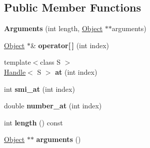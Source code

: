 \subsection*{Public Member Functions}
\begin{DoxyCompactItemize}
\item 
\hypertarget{classv8_1_1internal_1_1_b_a_s_e___e_m_b_e_d_d_e_d_add33908956d9bed09a8bca6b0d740f15}{}{\bfseries Arguments} (int length, \hyperlink{classv8_1_1internal_1_1_object}{Object} $\ast$$\ast$arguments)\label{classv8_1_1internal_1_1_b_a_s_e___e_m_b_e_d_d_e_d_add33908956d9bed09a8bca6b0d740f15}

\item 
\hypertarget{classv8_1_1internal_1_1_b_a_s_e___e_m_b_e_d_d_e_d_abc66cea105fe88e86c3d7b8dde50a580}{}\hyperlink{classv8_1_1internal_1_1_object}{Object} $\ast$\& {\bfseries operator\mbox{[}$\,$\mbox{]}} (int index)\label{classv8_1_1internal_1_1_b_a_s_e___e_m_b_e_d_d_e_d_abc66cea105fe88e86c3d7b8dde50a580}

\item 
\hypertarget{classv8_1_1internal_1_1_b_a_s_e___e_m_b_e_d_d_e_d_a798750e6054524ded89f7e3aae595cc9}{}{\footnotesize template$<$class S $>$ }\\\hyperlink{classv8_1_1internal_1_1_handle}{Handle}$<$ S $>$ {\bfseries at} (int index)\label{classv8_1_1internal_1_1_b_a_s_e___e_m_b_e_d_d_e_d_a798750e6054524ded89f7e3aae595cc9}

\item 
\hypertarget{classv8_1_1internal_1_1_b_a_s_e___e_m_b_e_d_d_e_d_a0baf7dbae1e7fffaaf243aafc160ef2c}{}int {\bfseries smi\+\_\+at} (int index)\label{classv8_1_1internal_1_1_b_a_s_e___e_m_b_e_d_d_e_d_a0baf7dbae1e7fffaaf243aafc160ef2c}

\item 
\hypertarget{classv8_1_1internal_1_1_b_a_s_e___e_m_b_e_d_d_e_d_a96a0211888c152b4db1c32fd169fab7b}{}double {\bfseries number\+\_\+at} (int index)\label{classv8_1_1internal_1_1_b_a_s_e___e_m_b_e_d_d_e_d_a96a0211888c152b4db1c32fd169fab7b}

\item 
\hypertarget{classv8_1_1internal_1_1_b_a_s_e___e_m_b_e_d_d_e_d_aaf57eaaeae1bbeb27a8d033b1b889f3c}{}int {\bfseries length} () const \label{classv8_1_1internal_1_1_b_a_s_e___e_m_b_e_d_d_e_d_aaf57eaaeae1bbeb27a8d033b1b889f3c}

\item 
\hypertarget{classv8_1_1internal_1_1_b_a_s_e___e_m_b_e_d_d_e_d_a6d5c730dd16865e031579f10f478caaa}{}\hyperlink{classv8_1_1internal_1_1_object}{Object} $\ast$$\ast$ {\bfseries arguments} ()\label{classv8_1_1internal_1_1_b_a_s_e___e_m_b_e_d_d_e_d_a6d5c730dd16865e031579f10f478caaa}


\end{DoxyCompactItemize}
